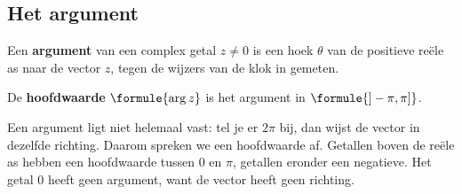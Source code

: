\subsection{Het argument}

\begin{theorie}
\begin{minipage}[t]{.57\linewidth}
\vspace{0pt}
Een \textbf{\textcolor{accent}{argument}} van een complex getal $z \neq 0$ is een hoek $\theta$ van de positieve reële as naar de vector $z$, tegen de wijzers van de klok in gemeten.

\vspace{1mm}
De \textbf{\textcolor{accent}{hoofdwaarde}} $\formule{\arg z}$ is het argument in $\formule{]-\pi, \pi]}$.
\end{minipage}\hfill
\begin{minipage}[t]{.38\linewidth}
\vspace{0pt}
\end{minipage}
\end{theorie}

Een argument ligt niet helemaal vast: tel je er $2\pi$ bij, dan wijst de vector in dezelfde richting. Daarom spreken we een hoofdwaarde af. Getallen boven de reële as hebben een hoofdwaarde tussen 0 en $\pi$, getallen eronder een negatieve. Het getal 0 heeft geen argument, want de vector heeft geen richting.

